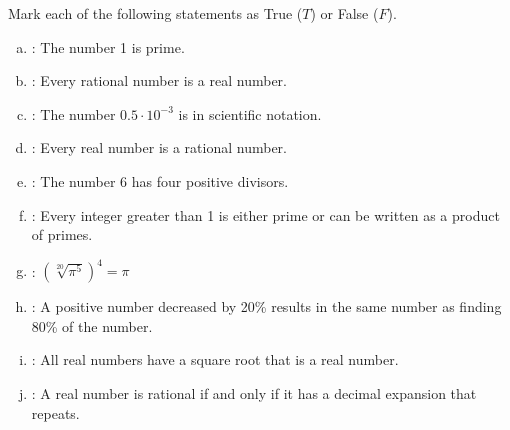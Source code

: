 \documentclass[12pt,letterpaper]{exam}
\begin{document}
\examtitle
{} 
\scores
\newpage

\begin{questions}

\newpage
\question[10] Mark each  of the following statements as True ($T$) or False ($F$). \pspace
\begin{enumerate}[(a)]
\item \underline{\hspace{1.5cm}}: The number 1 is prime. \vfill
\item \underline{\hspace{1.5cm}}: Every rational number is a real number. \vfill
\item \underline{\hspace{1.5cm}}: The number $0.5 \cdot 10^{-3}$ is in scientific notation. \vfill
\item \underline{\hspace{1.5cm}}: Every real number is a rational number. \vfill
\item \underline{\hspace{1.5cm}}: The number 6 has four positive divisors. \vfill
\item \underline{\hspace{1.5cm}}: Every integer greater than 1 is either prime or can be written as a product of primes. \vfill
\item \underline{\hspace{1.5cm}}: $\left( \sqrt[20]{\pi^5} \right)^4= \pi$ \vfill

\item \underline{\hspace{1.5cm}}: A positive number decreased by 20\% results in the same number as finding 80\% of the number. \vfill
\item \underline{\hspace{1.5cm}}: All real numbers have a square root that is a real number. \vfill
\item \underline{\hspace{1.5cm}}: A real number is rational if and only if it has a decimal expansion that repeats. \vfill
\end{enumerate}




\end{questions}
\end{document}
